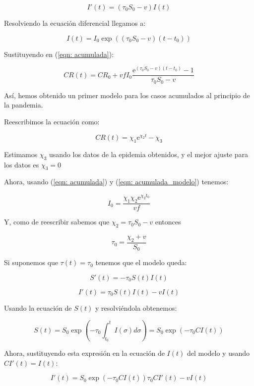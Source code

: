 $$I'(t) = (\tau_0 S_0 -v) I(t)$$

Resolviendo la ecuación diferencial llegamos a:

$$I(t) = I_0\exp{((\tau_0 S_0-v)(t-t_0))}$$

Sustituyendo en (\ref{eqn: acumulada}):

$$CR(t) = CR_0 + vfI_0\frac{\mathrm{e}^{(\tau_0 S_0 -v)(t-t_0)} -1}{\tau_0 S_0-v}$$

Así, hemos obtenido un primer modelo para los casos acumulados al principio de la pandemia.

Reescribimos la ecuación como:

\begin{equation}
\label{eqn: acumulada_modelo}
CR(t) = \chi_1 \mathrm{e}^{\chi_2 t} -\chi_3
\end{equation}

Estimamos $\chi_3$ usando los datos de la epidemia obtenidos, y el mejor ajuste para los datos es $\chi_3=0$

Ahora, usando (\ref{eqn: acumulada}) y (\ref{eqn: acumulada_modelo}) tenemos:

\begin{equation}
I_0=\frac{\chi_1\chi_2\mathrm{e}^{\chi_2 t_0}}{vf}
\end{equation}

Y, como de reescribir sabemos que $\chi_2 = \tau_0 S_0-v$ entonces

\begin{equation}
\tau_0 = \frac{\chi_2+v}{S_0}
\end{equation}

Si suponemos que $\tau (t) = \tau_0$ tenemos que el modelo queda:

\begin{equation}
S'(t) = -\tau_0S(t)I(t)
\end{equation}

\begin{equation}
I'(t) = \tau_0S(t)I(t) -vI(t)
\end{equation}

Usando la ecuación de $S(t)$ y resolviéndola obtenemos:

$$S(t) = S_0\exp{\left( -\tau_0 \int_{t_0}^t I(\sigma ) d\sigma \right)} = S_0\exp{(-\tau_0 CI(t))}$$

Ahora, sustituyendo esta expresión en la ecuación de $I(t)$ del modelo y usando $CI'(t)=I(t)$:

$$I'(t) = S_0\exp{\left( -\tau_0 CI(t)\right) }\tau_0 CI'(t)-vI(t)$$

